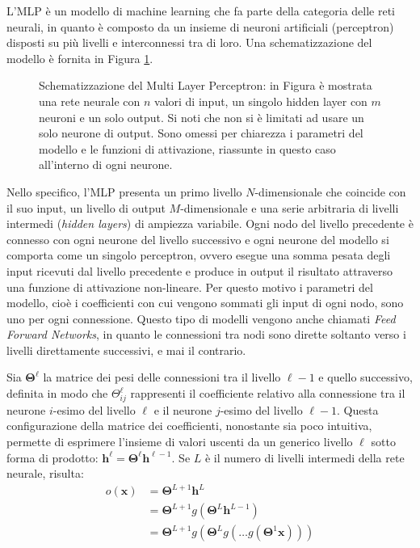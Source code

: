 \documentclass{standalone}
\begin{document}
L'MLP è un modello di machine learning che fa parte della categoria delle reti
neurali, in quanto è composto da un insieme di neuroni artificiali
(perceptron) disposti su più livelli e interconnessi tra di loro. Una
schematizzazione del modello è fornita in Figura \ref{fig:mlp}.
\begin{figure}[!htp]
  \caption{Schematizzazione del Multi Layer Perceptron: in Figura è mostrata
    una rete neurale con $n$ valori di input, un singolo hidden layer con $m$
    neuroni e un solo output. Si noti che non si è limitati ad usare un solo
    neurone di output. Sono omessi per chiarezza i parametri del modello e le
    funzioni di attivazione, riassunte in questo caso all'interno di ogni
    neurone.}
  \label{fig:mlp}
\end{figure}
Nello specifico, l'MLP presenta un primo livello $N$-dimensionale che coincide con il
suo input, un livello di output $M$-dimensionale e una serie arbitraria di
livelli intermedi (\emph{hidden layers}) di ampiezza variabile. Ogni nodo del
livello precedente è connesso con ogni neurone del livello successivo e ogni
neurone del modello si comporta come un singolo perceptron, ovvero esegue una
somma pesata degli input ricevuti dal livello precedente e produce in output il
risultato attraverso una funzione di attivazione non-lineare. Per questo motivo
i parametri del modello, cioè i coefficienti con cui vengono sommati gli input
di ogni nodo, sono uno per ogni connessione. Questo tipo di modelli vengono
anche chiamati \emph{Feed Forward Networks}, in quanto le connessioni tra nodi
sono dirette soltanto verso i livelli direttamente successivi, e mai il
contrario.

Sia $\bm \Theta^\ell$ la matrice dei pesi delle connessioni tra il livello
$\ell-1$ e quello successivo, definita in modo che $ \Theta^\ell_{ij} $
rappresenti il coefficiente relativo alla connessione tra il neurone $i$-esimo
del livello $\ell$ e il neurone $j$-esimo del livello $\ell-1$. Questa
configurazione della matrice dei coefficienti, nonostante sia poco intuitiva,
permette di esprimere l'insieme di valori uscenti da un generico livello $\ell$
sotto forma di prodotto: $ \bm h^\ell = \bm \Theta^\ell \bm h^{\ell-1}$. Se
$L$ è il numero di livelli intermedi della rete neurale, risulta:
\begin{align*}
  o(\bm x) &= \bm \Theta^{L+1} \bm h^L \\
  &= \bm \Theta^{L+1} g( \bm \Theta^L \bm h^{L-1}) \\
  &= \bm \Theta^{L+1} g(\bm \Theta^L g(\dots g(\bm \Theta^1 \bm x)))
\end{align*}
\end{document}
